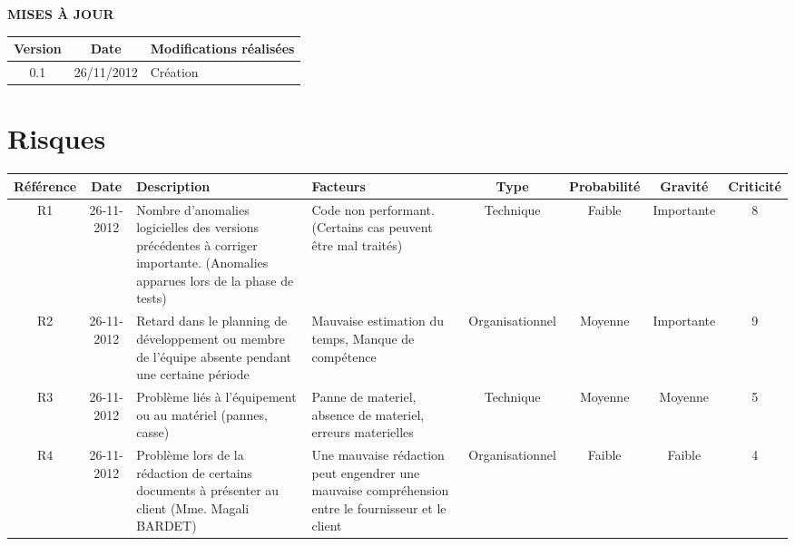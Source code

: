 \documentclass[a4paper,11pt,french]{article}
\begin{document}
\makeFirstPage
\clearpage
\vspace*{1cm}
\begin{center}
\textbf{\huge{MISES À JOUR}}\\
\vspace*{3cm}
	\begin{tabularx}{16cm}{|c|c|X|}
	\hline
	\bfseries{Version} & \bfseries{Date} & \bfseries{Modifications
réalisées}\\
	\hline
	0.1 & 26/11/2012 & Création\\
	\hline
	\end{tabularx}
\end{center}

\clearpage

\section{Risques}
\begin{flushleft}
\begin{small} 
\begin{tabularx}{18cm}{|c|c|p{2.28cm}|p{2cm}|c|c|c|c|}
\hline
\cellcolor[gray]{.7} Référence & \cellcolor[gray]{.7} Date & \cellcolor[gray]{.7}Description & \cellcolor[gray]{.7}Facteurs & \cellcolor[gray]{.7}Type & \cellcolor[gray]{.7}Probabilité & \cellcolor[gray]{.7}Gravité &
\cellcolor[gray]{.7}Criticité\\
\hline
R1 & 26-11-2012 & 
Nombre d'anomalies logicielles des versions précédentes
à corriger importante. (Anomalies apparues lors de la phase de tests)
& Code non performant. (Certains cas peuvent être mal traités)
& Technique & Faible & Importante & 8 \\
\hline
R2 & 26-11-2012 &
Retard dans le planning de
développement ou membre de l’équipe absente pendant une certaine période
& Mauvaise estimation du temps, Manque de compétence
& Organisationnel & Moyenne & Importante & 9 \\
\hline
R3 & 26-11-2012 &
Problème liés à l’équipement ou au matériel (pannes, casse)
& 
Panne de materiel, absence de materiel, erreurs materielles 
& Technique & Moyenne & Moyenne & 5 \\
\hline
R4 & 26-11-2012 & Problème lors de la rédaction de certains documents à
présenter au client (Mme. Magali BARDET)
& Une mauvaise rédaction peut engendrer une mauvaise compréhension entre le
fournisseur et le client
& Organisationnel & Faible & Faible & 4 \\
\hline
\end{tabularx}

\end{small}
\end{flushleft}
\end{document}
